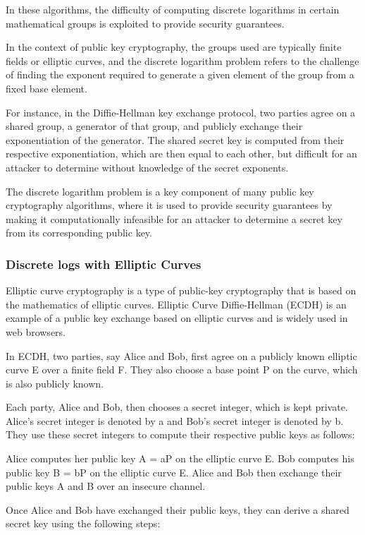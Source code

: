 \documentclass{article}
\begin{document}
In these algorithms, the difficulty of computing discrete logarithms in certain mathematical groups is exploited to provide security guarantees.

In the context of public key cryptography, the groups used are typically finite fields or elliptic curves, and the discrete logarithm problem refers to the challenge of finding the exponent required to generate a given element of the group from a fixed base element.

For instance, in the Diffie-Hellman key exchange protocol, two parties agree on a shared group, a generator of that group, and publicly exchange their exponentiation of the generator. The shared secret key is computed from their respective exponentiation, which are then equal to each other, but difficult for an attacker to determine without knowledge of the secret exponents.

The discrete logarithm problem is a key component of many public key cryptography algorithms, where it is used to provide security guarantees by making it computationally infeasible for an attacker to determine a secret key from its corresponding public key.

\subsubsection{Discrete logs with Elliptic Curves}
Elliptic curve cryptography is a type of public-key cryptography that is based on the mathematics of elliptic curves. Elliptic Curve Diffie-Hellman (ECDH) is an example of a public key exchange based on elliptic curves and is widely used in web browsers.

In ECDH, two parties, say Alice and Bob, first agree on a publicly known elliptic curve E over a finite field F. They also choose a base point P on the curve, which is also publicly known.

Each party, Alice and Bob, then chooses a secret integer, which is kept private. Alice's secret integer is denoted by a and Bob's secret integer is denoted by b. They use these secret integers to compute their respective public keys as follows:

Alice computes her public key A = aP on the elliptic curve E.
Bob computes his public key B = bP on the elliptic curve E.
Alice and Bob then exchange their public keys A and B over an insecure channel.

Once Alice and Bob have exchanged their public keys, they can derive a shared secret key using the following steps:
\end{document}

